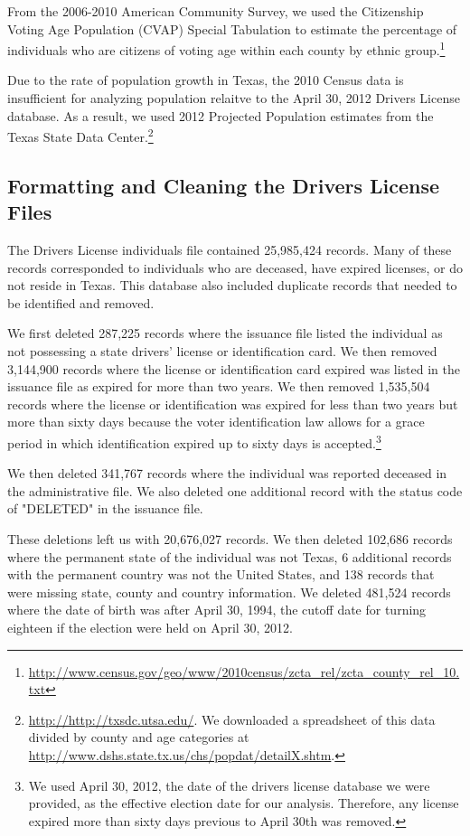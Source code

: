 \documentclass[12pt]{article}
\begin{document}
From the 2006-2010 American Community Survey, we used the Citizenship Voting Age Population (CVAP) Special Tabulation to estimate the percentage of individuals who are citizens of voting age within each county by ethnic group.\footnote{\url{http://www.census.gov/geo/www/2010census/zcta_rel/zcta_county_rel_10.txt}}

Due to the rate of population growth in Texas, the 2010 Census data is
insufficient for analyzing population relaitve to the April 30, 2012
Drivers License database.  As a result, we used 2012 Projected
Population estimates from the Texas State Data
Center.\footnote{\url{http://http://txsdc.utsa.edu/}.  We downloaded a
  spreadsheet of this data divided by county and age categories at
  \url{http://www.dshs.state.tx.us/chs/popdat/detailX.shtm}.}

\subsection{Formatting and Cleaning the Drivers License Files}
The Drivers License individuals file contained 25,985,424 records.
Many of these records corresponded to individuals who are deceased,
have expired licenses, or do not reside in Texas.  This database also
included duplicate records that needed to be identified and removed.

We first deleted 287,225 records where the issuance file listed the
individual as not possessing a state drivers' license or
identification card.  We then removed 3,144,900 records where the
license or identification card expired was listed in the issuance file
as expired for more than two years.  We then removed 1,535,504 records
where the license or identification was expired for less than two
years but more than sixty days because the voter identification law
allows for a grace period in which identification expired up to sixty
days is accepted.\footnote{We used April 30, 2012, the date of the
  drivers license database we were provided, as the effective election
  date for our analysis.  Therefore, any license expired more than
  sixty days previous to April 30th was removed.}

We then deleted 341,767 records where the individual was reported
deceased in the administrative file.  We also deleted one additional
record with the status code of "DELETED" in the issuance file.

These deletions left us with 20,676,027 records.  We then deleted
102,686 records where the permanent state of the individual was not
Texas, 6 additional records with the permanent country was not the
United States, and 138 records that were missing state, county and
country information.  We deleted 481,524 records where the date of
birth was after April 30, 1994, the cutoff date for turning eighteen
if the election were held on April 30, 2012.
\end{document}
